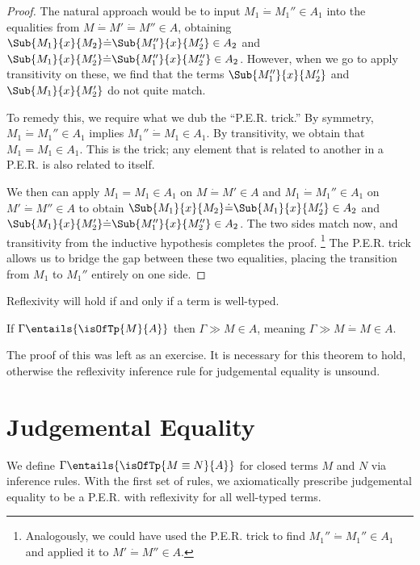 \documentclass[letterpaper]{article}
\begin{document}
\begin{proof}
The natural approach would be to input $M_1 \dot{=} M_1'' \in A_1$ into the equalities from $M \dot{=} M' \dot{=} M'' \in A$, obtaining 
$\Sub{M_1}{x}{M_2} \dot{=} \Sub{M_1''}{x}{M_2'} \in A_2$ and \\
$\Sub{M_1}{x}{M_2'} \dot{=} \Sub{M_1''}{x}{M_2''} \in A_2$. However, when we go to apply
transitivity on these, we find that the terms $\Sub{M_1''}{x}{M_2'}$ and $\Sub{M_1}{x}{M_2'}$ do not quite match. 

To remedy this, we require what we dub the ``P.E.R. trick.'' By symmetry, $M_1 \dot{=} M_1'' \in A_1$ implies $M_1'' \dot{=} M_1 \in A_1$.
By transitivity, we obtain that $M_1 = M_1 \in A_1$. This is the trick; any element that is related to another in a P.E.R. is also related to itself.

We then can apply $M_1 = M_1 \in A_1$ on $M \dot{=} M' \in A$ and $M_1 \dot{=} M_1'' \in A_1$ on $M' \dot{=} M'' \in A$ to obtain
$\Sub{M_1}{x}{M_2} \dot{=} \Sub{M_1}{x}{M_2'} \in A_2$ and $\Sub{M_1}{x}{M_2'} \dot{=} \Sub{M_1''}{x}{M_2''} \in A_2$. The two sides match now, 
and transitivity from the inductive hypothesis completes the proof.
\footnote{Analogously, we could have used the P.E.R. trick to find $M_1'' \dot{=} M_1'' \in A_1$ and applied it to $M' \dot{=} M'' \in A$.}
The P.E.R. trick allows us to bridge the gap between these two equalities, placing the transition from $M_1$ to $M_1''$ entirely on one side.  

\end{proof}

Reflexivity will hold if and only if a term is well-typed.

\begin{theorem}[Reflexivity]
    If $\Gamma \entails{\isOfTp{M}{A}}$ then $\Gamma \gg M \in A$, meaning $\Gamma \gg M \dot{=} M \in A$.
\end{theorem}
The proof of this was left as an exercise. It is necessary for this theorem to hold, otherwise the reflexivity inference rule for judgemental equality is unsound.

\section{Judgemental Equality}\label{sec:jeq}

We define $\Gamma \entails{\isOfTp{M \equiv N}{A}}$ for closed terms $M$ and $N$ via inference rules. 
With the first set of rules, we axiomatically prescribe judgemental equality to be a P.E.R. with reflexivity
for all well-typed terms. 
\end{document}
